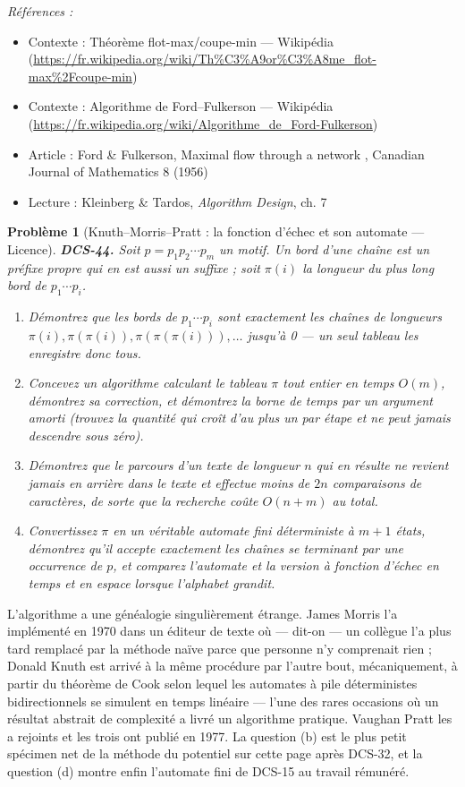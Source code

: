 \documentclass[11pt]{article}
\newtheorem{problem}{Problème}
\newenvironment{refs}{\par\small\noindent\emph{Références :}\begin{itemize}\setlength\itemsep{0pt}}{\end{itemize}\normalsize}
\begin{document}
\begin{refs}
\item Contexte : Théorème flot-max/coupe-min --- Wikipédia (\url{https://fr.wikipedia.org/wiki/Th%C3%A9or%C3%A8me_flot-max%2Fcoupe-min})
\item Contexte : Algorithme de Ford--Fulkerson --- Wikipédia (\url{https://fr.wikipedia.org/wiki/Algorithme_de_Ford-Fulkerson})
\item Article : Ford \& Fulkerson, \og{} Maximal flow through a network \fg{}, Canadian Journal of Mathematics 8 (1956)
\item Lecture : Kleinberg \& Tardos, \textit{Algorithm Design}, ch. 7
\end{refs}

\bigskip

\begin{problem}[{Knuth--Morris--Pratt : la fonction d'échec et son automate --- Licence}]
\textbf{DCS-44.} Soit $ p = p_1 p_2 \cdots p_m $ un motif. Un \textit{bord} d'une chaîne est un préfixe propre qui en est aussi un suffixe ; soit $ \pi(i) $ la longueur du plus long bord de $ p_1 \cdots p_i $.
\begin{enumerate}
\item[(a)] Démontrez que les bords de $ p_1 \cdots p_i $ sont exactement les chaînes de longueurs $ \pi(i), \pi(\pi(i)), \pi(\pi(\pi(i))), \dots $ jusqu'à 0 --- un seul tableau les enregistre donc tous.
\item[(b)] Concevez un algorithme calculant le tableau $ \pi $ tout entier en temps $ O(m) $, démontrez sa correction, et démontrez la borne de temps par un argument amorti (trouvez la quantité qui croît d'au plus un par étape et ne peut jamais descendre sous zéro).
\item[(c)] Démontrez que le parcours d'un texte de longueur $ n $ qui en résulte ne revient jamais en arrière dans le texte et effectue moins de $ 2n $ comparaisons de caractères, de sorte que la recherche coûte $ O(n + m) $ au total.
\item[(d)] Convertissez $ \pi $ en un véritable automate fini déterministe à $ m+1 $ états, démontrez qu'il accepte exactement les chaînes se terminant par une occurrence de $ p $, et comparez l'automate et la version à fonction d'échec en temps et en espace lorsque l'alphabet grandit.
\end{enumerate}

\end{problem}

\noindent L'algorithme a une généalogie singulièrement étrange. James Morris l'a implémenté en 1970 dans un éditeur de texte où --- dit-on --- un collègue l'a plus tard remplacé par la méthode naïve parce que personne n'y comprenait rien ; Donald Knuth est arrivé à la même procédure par l'autre bout, mécaniquement, à partir du théorème de Cook selon lequel les automates à pile déterministes bidirectionnels se simulent en temps linéaire --- l'une des rares occasions où un résultat abstrait de complexité a livré un algorithme pratique. Vaughan Pratt les a rejoints et les trois ont publié en 1977. La question (b) est le plus petit spécimen net de la méthode du potentiel sur cette page après DCS-32, et la question (d) montre enfin l'automate fini de DCS-15 au travail rémunéré.
\end{document}
